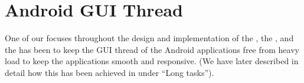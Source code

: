 
\section{Android GUI Thread}
\label{sec:gui_thread_async_task}

One of our focuses throughout the design and implementation of the \launcher, the \ct, and the \gc has been to keep the GUI thread of the Android applications free from heavy load to keep the applications smooth and responsive. (We have later described in detail how this has been achieved in  under ``Long tasks'').

 

